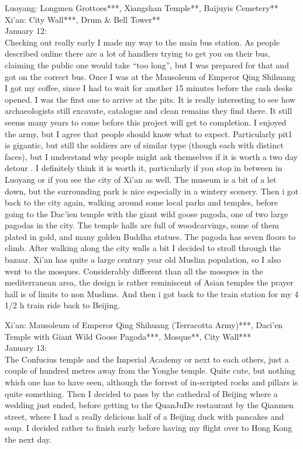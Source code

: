 Luoyang: Longmen Grottoes***, Xiangshan Temple**, Baijuyis Cemetery**\\
Xi'an: City Wall***, Drum \& Bell Tower**\\

January 12:\\
Checking out really early I made my way to the main bus station. As people described online there are a lot of handlers trying to get you on their bus, claiming the public one would take ``too long'', but I was prepared for that and got on the correct bus. Once I was at the Mausoleum of Emperor Qing Shihuang I got my coffee, since I had to wait for another 15 minutes before the cash desks opened. I was the first one to arrive at the pits. It is really interesting to see how archaeologists still excavate, catalogue and clean remains they find there. It still seems many years to come before this project will get to completion. I enjoyed the army, but I agree that people should know what to expect. Particularly pit1 is gigantic, but still the soldiers are of similar type (though each with distinct faces), but I understand why people might ask themselves if it is worth a two day detour . I definitely think it is worth it, particularly if you stop in between in Luoyang or if you see the city of Xi'an as well. The museum is a bit of a let down, but the surrounding park is nice especially in a wintery scenery. Then i got back to the city again, walking around some local parks and temples, before going to the Dac'ien temple with the giant wild goose pagoda, one of two large pagodas in the city. The temple halls are full of woodcarvings, some of them plated in gold, and many golden Buddha statues. The pagoda has seven floors to climb. After walking along the city walls a bit I decided to stroll through the bazaar. Xi'an has quite a large century year old Muslim population, so I also went to the mosques. Considerably different than all the mosques in the mediterranean area, the design is rather reminiscent of Asian temples the prayer hall is of limits to non Muslims. And then i got back to the train station for my 4 1/2 h train ride back to Beijing.

Xi'an: Mausoleum of Emperor Qing Shihuang (Terracotta Army)***, Daci'en Temple with Giant Wild Goose Pagoda***, Mosque**, City Wall***\\

January 13:\\
The Confucius temple and the Imperial Academy or next to each others, just a couple of hundred metres away from the Yonghe temple. Quite cute, but nothing which one has to have seen, although the forrest of in-scripted rocks and pillars is quite something. Then I decided to pass by the cathedral of Beijing where a wedding just ended, before getting to the QuanJuDe restaurant by the Qianmen street, where I had a really delicious half of a Beijing duck with pancakes and soup. I decided rather to finish early before having my flight over to Hong Kong the next day.\\

